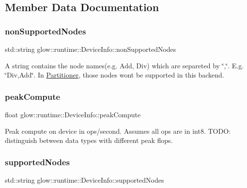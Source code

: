 \subsection{Member Data Documentation}
\mbox{\label{structglow_1_1runtime_1_1_device_info_a732b81463b0439deec1666f33cef128f}} 
\subsubsection{\texorpdfstring{non\+Supported\+Nodes}{nonSupportedNodes}}
{\footnotesize\ttfamily std\+::string glow\+::runtime\+::\+Device\+Info\+::non\+Supported\+Nodes}

A string contains the node names(e.\+g. Add, Div) which are separeted by \char`\"{},\char`\"{}. E.\+g. \char`\"{}\+Div,\+Add\char`\"{}. In \hyperlink{classglow_1_1_partitioner}{Partitioner}, those nodes won\textquotesingle{}t be supported in this backend. \mbox{\label{structglow_1_1runtime_1_1_device_info_afda59a78f7d60ed3cab125b778e270cb}} 
\subsubsection{\texorpdfstring{peak\+Compute}{peakCompute}}
{\footnotesize\ttfamily float glow\+::runtime\+::\+Device\+Info\+::peak\+Compute}

Peak compute on device in ops/second. Assumes all ops are in int8. T\+O\+DO\+: distinguish between data types with different peak flops. \mbox{\label{structglow_1_1runtime_1_1_device_info_af83b26fbfab3a0c8397885fa42767fd6}} 
\subsubsection{\texorpdfstring{supported\+Nodes}{supportedNodes}}
{\footnotesize\ttfamily std\+::string glow\+::runtime\+::\+Device\+Info\+::supported\+Nodes}

